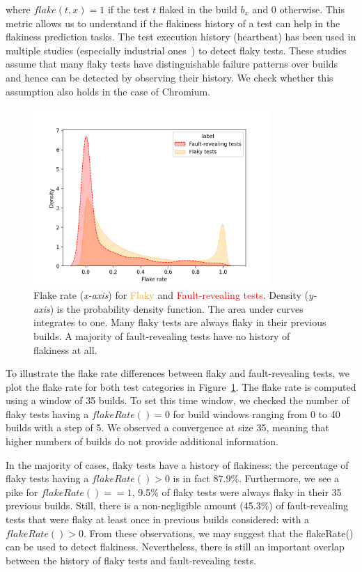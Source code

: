 where $flake(t,x) = 1$ if the test $t$ flaked in the build $b_{x}$ and 0 otherwise.
This metric allows us to understand if the flakiness history of a test can help in the flakiness prediction tasks.
The test execution history (\aka heartbeat) has been used in multiple studies (especially industrial ones~\cite{Kowalczyk2020,LeongSPTM19}) to detect flaky tests.
These studies assume that many flaky tests have distinguishable failure patterns over builds and hence can be detected by observing their history.
We check whether this assumption also holds in the case of Chromium.

\begin{figure}[!htbp]
    \vspace{-1em}
  \centering
    \includegraphics[width=0.8\textwidth]{figures/chromium/densityFlakeRate.png}
    \vspace{-1em}
    \caption{Flake rate (\textit{x-axis}) for \textcolor{orange}{Flaky} and \textcolor{red}{Fault-revealing tests}. Density (\textit{y-axis}) is the probability density function. The area under curves integrates to one. Many flaky tests are always flaky in their previous builds. A majority of fault-revealing tests have no history of flakiness at all.}
    \label{fig:kdeRates}
\end{figure}

To illustrate the flake rate differences between flaky and fault-revealing tests, we plot the flake rate for both test categories in Figure~\ref{fig:kdeRates}. The flake rate is computed using a window of 35 builds. To set this time window, we checked the number of flaky tests having a $flakeRate() = 0$ for build windows ranging from 0 to 40 builds with a step of 5. We observed a convergence at size 35, meaning that higher numbers of builds do not provide additional information.

In the majority of cases, flaky tests have a history of flakiness: the percentage of flaky tests having a $flakeRate() > 0$ is in fact $87.9\%$. Furthermore, we see a pike for $flakeRate() == 1$, 9.5\% of flaky tests were always flaky in their 35 previous builds. 
Still, there is a non-negligible amount (45.3\%) of fault-revealing tests that were flaky at least once in previous builds considered: with a $flakeRate() > 0$.
From these observations, we may suggest that the \textsf{flakeRate()} can be used to detect flakiness.
Nevertheless, there is still an important overlap between the history of flaky tests and fault-revealing tests. 

